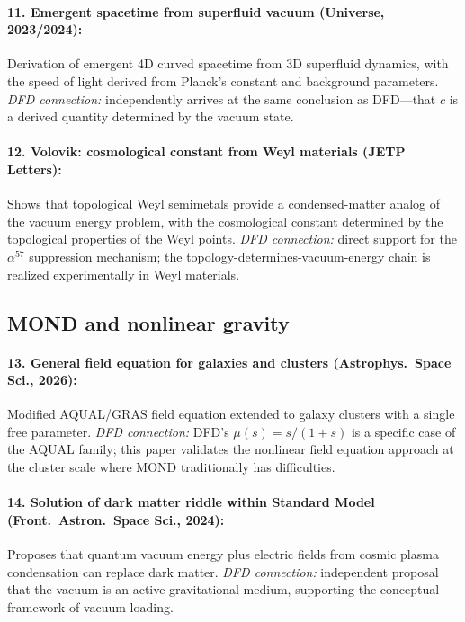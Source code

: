 \documentclass[aps,prd,twocolumn,superscriptaddress,nofootinbib]{revtex4-2}
\begin{document}
\paragraph{11. Emergent spacetime from superfluid vacuum (Universe,
2023/2024):}
Derivation of emergent 4D curved spacetime from 3D superfluid
dynamics, with the speed of light derived from Planck's constant and
background parameters.  \emph{DFD connection:} independently arrives
at the same conclusion as DFD---that $c$ is a derived quantity
determined by the vacuum state.

\paragraph{12. Volovik: cosmological constant from Weyl materials
(JETP Letters):}
Shows that topological Weyl semimetals provide a condensed-matter
analog of the vacuum energy problem, with the cosmological constant
determined by the topological properties of the Weyl points.
\emph{DFD connection:} direct support for the $\alpha^{57}$
suppression mechanism; the topology-determines-vacuum-energy chain
is realized experimentally in Weyl materials.

\subsection{MOND and nonlinear gravity}

\paragraph{13. General field equation for galaxies and clusters
(Astrophys.\ Space Sci., 2026):}
Modified AQUAL/GRAS field equation extended to galaxy clusters
with a single free parameter.  \emph{DFD connection:} DFD's
$\mu(s) = s/(1+s)$ is a specific case of the AQUAL family; this
paper validates the nonlinear field equation approach at the
cluster scale where MOND traditionally has difficulties.

\paragraph{14. Solution of dark matter riddle within Standard Model
(Front.\ Astron.\ Space Sci., 2024):}
Proposes that quantum vacuum energy plus electric fields from cosmic
plasma condensation can replace dark matter.  \emph{DFD connection:}
independent proposal that the vacuum is an active gravitational medium,
supporting the conceptual framework of vacuum loading.
\end{document}
